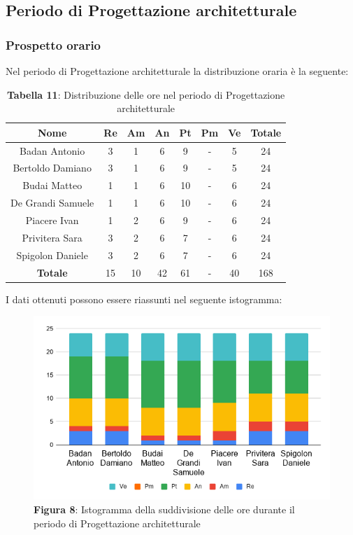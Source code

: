 \subsection{Periodo di Progettazione architetturale}
\subsubsection{Prospetto orario}
Nel periodo di Progettazione architetturale la distribuzione oraria è la seguente:

\begin{table}[H]
	\centering
	\renewcommand{\arraystretch}{1.5}
	\begin{tabular}{|c|c|c|c|c|c|c|c|}
		\hline
		\rowcolor{lighter-grayer}
Nome & Re & Am & An & Pt & Pm & Ve & Totale \\ \hline
Badan Antonio & 3 & 1 & 6 & 9 & - & 5 & 24 \\ \hline
Bertoldo Damiano & 3 & 1 & 6 & 9 & - & 5 & 24 \\ \hline
Budai Matteo & 1 & 1 & 6 & 10 & - & 6 & 24 \\ \hline
De Grandi Samuele & 1 & 1 & 6 & 10 & - & 6 & 24 \\ \hline
Piacere Ivan & 1 & 2 & 6 & 9 & - & 6 & 24 \\ \hline
Privitera Sara & 3 & 2 & 6 & 7 & - & 6 & 24 \\ \hline
Spigolon Daniele & 3 & 2 & 6 & 7 & - & 6 & 24 \\ \hline
\textbf{Totale} & 15 & 10 & 42 & 61 & - & 40 & 168 \\ \hline
	\end{tabular}
	\caption*{\textbf{Tabella 11}: Distribuzione delle ore nel periodo di Progettazione architetturale\\}
\end{table}	
I dati ottenuti possono essere riassunti nel seguente istogramma:

\begin{figure}[H]
	\centering
	\includegraphics[width=0.7\linewidth]{res/images/IstogrammaFase2.png}
	\caption*{\textbf{Figura 8}: Istogramma della suddivisione delle ore durante il periodo di Progettazione architetturale}
	\label{fig:Figura10}
\end{figure}


